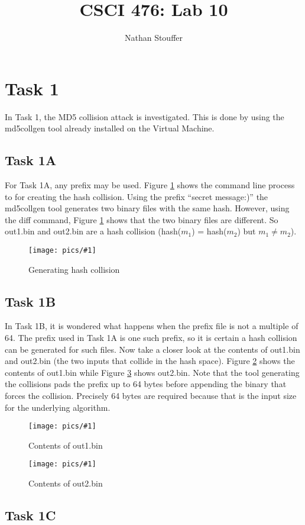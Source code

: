 \documentclass[11pt]{article}
\newcommand{\fig}[2]{ 
\begin{figure}[h]
	\centering
	\caption{#2}
	\texttt{[image: pics/\#1]}
	\label{fig:#1}
\end{figure} 
}
\begin{document}
\title{CSCI 476: Lab 10}
\author{Nathan Stouffer}
\maketitle
\newpage

\newpage
\section*{Task 1}

In Task 1, the MD5 collision attack is investigated. This is done by using the md5collgen tool already installed on the Virtual Machine.

\subsection*{Task 1A}

For Task 1A, any prefix may be used. Figure \ref{fig:task1.a.1} shows the command line process to for creating the hash collision. Using the prefix ``secret message:)'' the md5collgen tool generates two binary files with the same hash. However, using the diff command, Figure \ref{fig:task1.a.1} shows that the two binary files are different. So out1.bin and out2.bin are a hash collision (hash($m_1$) = hash($m_2$) but $m_1 \neq m_2$).

\fig{task1.a.1}{Generating hash collision}

\subsection*{Task 1B}

In Task 1B, it is wondered what happens when the prefix file is not a multiple of 64. The prefix used in Task 1A is one such prefix, so it is certain a hash collision can be generated for such files. Now take a closer look at the contents of out1.bin and out2.bin (the two inputs that collide in the hash space). Figure \ref{fig:task1.b.1} shows the contents of out1.bin while Figure \ref{fig:task1.b.2} shows out2.bin. Note that the tool generating the collisions pads the prefix up to 64 bytes before appending the binary that forces the collision. Precisely 64 bytes are required because that is the input size for the underlying algorithm.

\fig{task1.b.1}{Contents of out1.bin}

\fig{task1.b.2}{Contents of out2.bin}

\subsection*{Task 1C}
\end{document}
